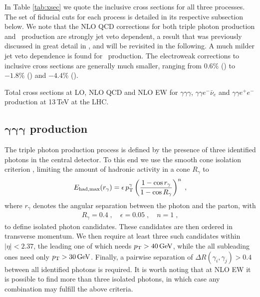 In Table \ref{tab:xsec} we quote the inclusive cross sections for all 
three processes. 
The set of fiducial cuts for each process is detailed in its 
respective subsection below. 
We note that the NLO QCD corrections for both triple photon 
production and \aaw\ production are strongly jet veto dependent, 
a result that was previously discussed in great detail in 
\cite{Bozzi:2011en,Bozzi:2011wwa}, and will be revisited in the 
following. 
A much milder jet veto dependence is found for \aaz\ production. 
The electroweak corrections to inclusive cross sections are 
generally much smaller, ranging from $0.6\%$ (\aaa) to $-1.8\%$ (\aaw) 
and $-4.4\%$ (\aaz).

\begin{table}[t!]
  
  \caption{
    Total cross sections at LO, NLO QCD and NLO EW for $\gamma\gamma\gamma$, 
    $\gamma\gamma e^-\bar\nu_e$ and $\gamma\gamma e^+e^-$
    production at 13\,TeV at the LHC.
    \label{tab:xsec}
  } 
\end{table}


\subsection[\texorpdfstring{$\gamma\gamma\gamma$}{aaa} production]
           {$\boldsymbol{\gamma\gamma\gamma}$ production}
\label{sec:results:aaa}

The triple photon production process is defined 
by the presence of three identified photons in the 
central detector. 
To this end we use the smooth cone isolation 
criterion \cite{Frixione:1998jh}, limiting the amount of 
hadronic activity in a cone $R_\gamma$ to
\begin{equation}
  \begin{split}
    E_{{\rm had, max}} (r_{\gamma})
    = \epsilon\, p_\text{T}^{\gamma} \left( \frac{1-\cos r_\gamma}
				       {1-\cos R_\gamma}\right)^{n}\;,
  \end{split}
  \label{eq:frix}
\end{equation}
where $r_{\gamma}$ denotes the angular separation between the photon and 
the parton, with 
\begin{equation}
  \label{eq:coneparams}
  \begin{split}
    R_{\gamma}=0.4\;, \quad \epsilon = 0.05\;, \quad n = 1\;, 
  \end{split}
\end{equation}
to define isolated photon candidates.
These candidates are then ordered in transverse momentum. 
We then require at least three such candidates within $|\eta|<2.37$, 
the leading one of which needs $p_\text{T}>40\,\text{GeV}$, 
while the all subleading ones need only 
$p_\text{T}>30\,\text{GeV}$. 
Finally, a pairwise separation of $\Delta R(\gamma_i,\gamma_j)>0.4$ 
between all identified photons is required.
It is worth noting that at NLO EW it is possible to find more 
than three isolated photons, in which case any combination may 
fulfill the above criteria. 

